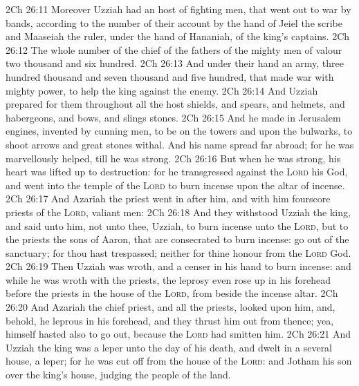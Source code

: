 \vs 2Ch 26:11 Moreover Uzziah had an host of fighting men, that went out to war by bands, according to the number of their account by the hand of Jeiel the scribe and Maaseiah the ruler, under the hand of Hananiah,  of the king's captains.
\vs 2Ch 26:12 The whole number of the chief of the fathers of the mighty men of valour  two thousand and six hundred.
\vs 2Ch 26:13 And under their hand  an army, three hundred thousand and seven thousand and five hundred, that made war with mighty power, to help the king against the enemy.
\vs 2Ch 26:14 And Uzziah prepared for them throughout all the host shields, and spears, and helmets, and habergeons, and bows, and slings  stones.
\vs 2Ch 26:15 And he made in Jerusalem engines, invented by cunning men, to be on the towers and upon the bulwarks, to shoot arrows and great stones withal. And his name spread far abroad; for he was marvellously helped, till he was strong.
\vs 2Ch 26:16 But when he was strong, his heart was lifted up to  destruction: for he transgressed against the \textsc{Lord} his God, and went into the temple of the \textsc{Lord} to burn incense upon the altar of incense.
\vs 2Ch 26:17 And Azariah the priest went in after him, and with him fourscore priests of the \textsc{Lord},  valiant men:
\vs 2Ch 26:18 And they withstood Uzziah the king, and said unto him,  not unto thee, Uzziah, to burn incense unto the \textsc{Lord}, but to the priests the sons of Aaron, that are consecrated to burn incense: go out of the sanctuary; for thou hast trespassed; neither  for thine honour from the \textsc{Lord} God.
\vs 2Ch 26:19 Then Uzziah was wroth, and  a censer in his hand to burn incense: and while he was wroth with the priests, the leprosy even rose up in his forehead before the priests in the house of the \textsc{Lord}, from beside the incense altar.
\vs 2Ch 26:20 And Azariah the chief priest, and all the priests, looked upon him, and, behold, he  leprous in his forehead, and they thrust him out from thence; yea, himself hasted also to go out, because the \textsc{Lord} had smitten him.
\vs 2Ch 26:21 And Uzziah the king was a leper unto the day of his death, and dwelt in a several house,  a leper; for he was cut off from the house of the \textsc{Lord}: and Jotham his son  over the king's house, judging the people of the land.
